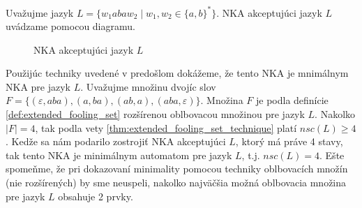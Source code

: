 \begin{example}
\normalfont Uvažujme jazyk $ L = \lbrace w_1abaw_2 \; | \; w_1,w_2 \in \lbrace a,b \rbrace^* \rbrace $. NKA akceptujúci jazyk $ L $ uvádzame pomocou diagramu.

\begin{figure}[H]
\centering
{}

\caption{NKA akceptujúci jazyk $ L $}
\end{figure}
Použijúc techniky uvedené v predošlom dokážeme, že tento NKA je mnimálnym NKA pre jazyk $ L $. Uvažujme množinu dvojíc slov $ F = \lbrace (\varepsilon, aba), (a,ba), (ab,a),(aba,\varepsilon) \rbrace $. Množina $ F $ je podla definície \ref{def:extended_fooling_set} rozšírenou oblbovacou množinou pre jazyk $ L $.  Nakolko $ |F| = 4 $, tak podla vety \ref{thm:extended_fooling_set_technique} platí $ nsc(L) \geq 4 $. Kedže sa nám podarilo zostrojiť NKA akceptujúci $ L $, ktorý má práve 4 stavy, tak tento NKA je minimálnym automatom pre jazyk $ L $, t.j. $ nsc(L) = 4 $. Ešte spomeňme, že pri dokazovaní minimality pomocou techniky oblbovacích množín (nie rozšírených) by sme neuspeli, nakolko najväčšia možná oblbovacia množina pre jazyk $ L $ obsahuje 2 prvky.
\end{example}

